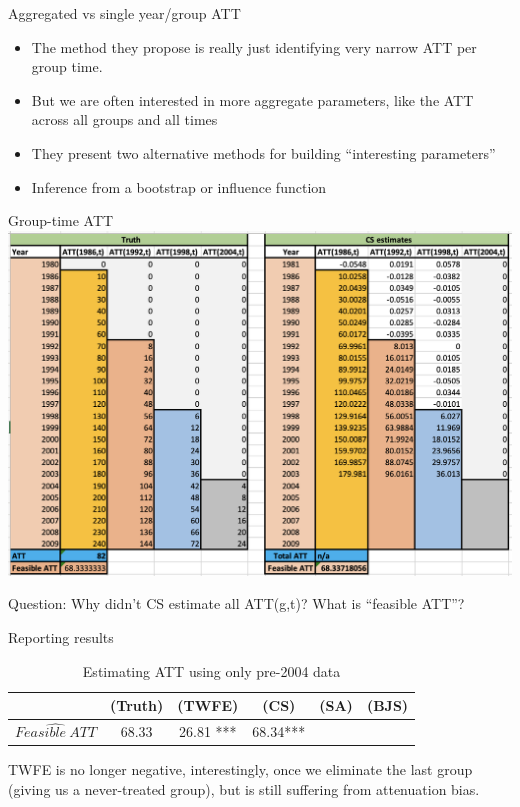 \documentclass{beamer}
\begin{document}
\begin{frame}{Aggregated vs single year/group ATT}

\begin{itemize}
\item The method they propose is really just identifying very narrow ATT per group time.
\item But we are often interested in  more aggregate parameters, like the ATT across all groups and all times
\item They present two alternative methods for building ``interesting parameters'' 
\item Inference from a bootstrap or influence function
\end{itemize}


\end{frame}



\begin{frame}{Group-time ATT }
             \includegraphics[scale=0.45]{./lecture_includes/baker_attgt_cs}

Question: Why didn't CS estimate all ATT(g,t)? What is ``feasible ATT''?

\end{frame}

\begin{frame}{Reporting results}
\begin{table}[htbp]\centering
\small
\caption{Estimating ATT using only pre-2004 data}
\begin{center}
\begin{tabular}{l*{5}{c}}
\hline
\multicolumn{1}{l}{\textbf{}}&
\multicolumn{1}{c}{\textbf{(Truth)}}&
\multicolumn{1}{c}{\textbf{(TWFE)}}&
\multicolumn{1}{c}{\textbf{(CS)}}&
\multicolumn{1}{c}{\textbf{(SA)}}&
\multicolumn{1}{c}{\textbf{(BJS)}}\\
\hline
$\widehat{Feasible\ ATT}$  & 68.33    & 26.81 *** & 68.34*** &&\\
\hline
\end{tabular}
\end{center}
\end{table}

TWFE is no longer negative, interestingly, once we eliminate the last group (giving us a never-treated group), but is still suffering from attenuation bias. 

\end{frame}
\end{document}
